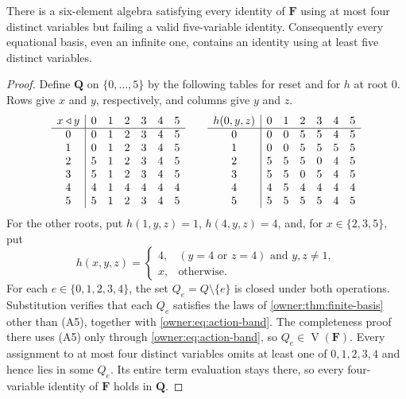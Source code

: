 \begin{theorem}\label{owner:thm:no-four-variable-basis}
There is a six-element algebra satisfying every identity of $\mathbf F$
using at most four distinct variables but failing a valid five-variable
identity. Consequently every equational basis, even an infinite one,
contains an identity using at least five distinct variables.
\end{theorem}
\begin{proof}
Define $\mathbf Q$ on $\{0,\dots,5\}$ by the following tables for reset
and for $h$ at root $0$. Rows give $x$ and $y$, respectively, and columns
give $y$ and $z$.
\[
\begin{array}{c|rrrrrr}
 x\mathbin{\triangleleft} y&0&1&2&3&4&5\\\hline
 0&0&1&2&3&4&5\\
 1&0&1&2&3&4&5\\
 2&5&1&2&3&4&5\\
 3&5&1&2&3&4&5\\
 4&4&1&4&4&4&4\\
 5&5&1&2&3&4&5
\end{array}
\qquad
\begin{array}{c|rrrrrr}
 h(0,y,z)&0&1&2&3&4&5\\\hline
 0&0&0&5&5&4&5\\
 1&0&0&5&5&5&5\\
 2&5&5&5&0&4&5\\
 3&5&5&0&5&4&5\\
 4&4&5&4&4&4&4\\
 5&5&5&5&5&4&5
\end{array}
\]
For the other roots, put $h(1,y,z)=1$, $h(4,y,z)=4$, and, for
$x\in\{2,3,5\}$, put
\[
 h(x,y,z)=
 \begin{cases}
 4,&(y=4\text{ or }z=4)\text{ and }y,z\ne1,\\
 x,&\text{otherwise}.
 \end{cases}
\]
For each $e\in\{0,1,2,3,4\}$, the set
$Q_e=Q\setminus\{e\}$ is closed under both operations.
Substitution verifies that each $Q_e$ satisfies the laws of
\cref{owner:thm:finite-basis} other than (A5), together with
\eqref{owner:eq:action-band}. The completeness proof there uses (A5) only
through \eqref{owner:eq:action-band}, so $Q_e\in\operatorname V(\mathbf F)$.
Every assignment to at most four distinct variables omits at least one of
$0,1,2,3,4$ and hence lies in some $Q_e$. Its entire term evaluation stays
there, so every four-variable identity of $\mathbf F$ holds in $\mathbf Q$.


\end{proof}
